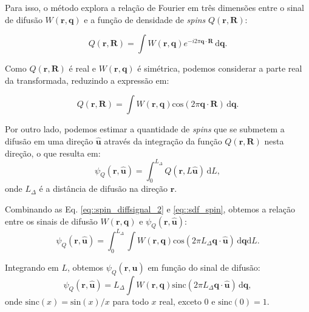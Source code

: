\documentclass[
    12pt,                %
    oneside,            %
    a4paper,            %
    english,            %
    french,                %
    spanish,            %
    brazil                %
    ]{abntex2}
\begin{document}
Para isso, o método explora a relação de Fourier em três dimensões entre o sinal de difusão $W(\mathbf{r}, \mathbf{q})$ e a função de densidade de \textit{spins} $Q(\mathbf{r}, \mathbf{R})$:

\begin{equation}
\label{eq::spin_diffsignal_1}
    Q(\mathbf{r}, \mathbf{R}) =
    \int \! W(\mathbf{r}, \mathbf{q})e^{-i2\pi \mathbf{q}\cdot \mathbf{R} } \,\mathrm{d}\mathbf{q} .
\end{equation}

Como $Q(\mathbf{r}, \mathbf{R})$ é real e $W(\mathbf{r}, \mathbf{q})$ é simétrica, podemos considerar a parte real da transformada, reduzindo a expressão em:

\begin{equation}
\label{eq::spin_diffsignal_2}
    Q(\mathbf{r}, \mathbf{R}) =
     \int \! W(\mathbf{r}, \mathbf{q})\text{cos}(2\pi \mathbf{q}\cdot \mathbf{R}) \,\mathrm{d}\mathbf{q} .
\end{equation}

Por outro lado, podemos estimar a quantidade de \textit{spins} que se submetem a difusão em uma direção $\mathbf{\hat{u}}$ através da integração da função $Q(\mathbf{r}, \mathbf{R})$ nesta direção, o que resulta em:
\begin{equation}
\label{eq::sdf_spin}
    \psi_Q(\mathbf{r}, \mathbf{\hat{u}}) =
   \int_{0}^{L_{\Delta}} Q(\mathbf{r}, L\mathbf{\hat{u}})\!  \,\mathrm{d}L , 
\end{equation}
onde $L_\Delta$ é a distância de difusão na direção  $\mathbf{r}$.

Combinando as Eq. \ref{eq::spin_diffsignal_2} e \ref{eq::sdf_spin}, obtemos a relação entre os sinais de difusão $W(\mathbf{r}, \mathbf{q})$ e $\psi_Q(\mathbf{r}, \mathbf{\hat{u}})$:
\begin{equation}
\label{eq::sdf_continuous_1}
    \psi_Q(\mathbf{r}, \mathbf{\hat{u}}) =
    \int_{0}^{L_{\Delta}}\int \! W(\mathbf{r}, \mathbf{q}) \text{cos}(2\pi L_{\Delta} \mathbf{q} \cdot \mathbf{\hat{u}}) \,\mathrm{d}\mathbf{q} \mathrm{d}L .
\end{equation}

Integrando em $L$, obtemos $\psi_Q(\mathbf{r}, \mathbf{\hat{u}})$ em função do sinal de difusão: 
\begin{equation}
\label{eq::sdf_continuous_2}
    \psi_Q(\mathbf{r}, \mathbf{\hat{u}}) =
    L_{\Delta} \int \! W(\mathbf{r}, \mathbf{q}) \text{sinc}(2\pi L_{\Delta} \mathbf{q} \cdot \mathbf{\hat{u}}) \,\mathrm{d}\mathbf{q} ,
\end{equation}
onde $\text{sinc}(x) = \text{sin}(x)/x$ para todo $x$ real, exceto $0$ e $\text{sinc}(0) = 1$.
\end{document}
